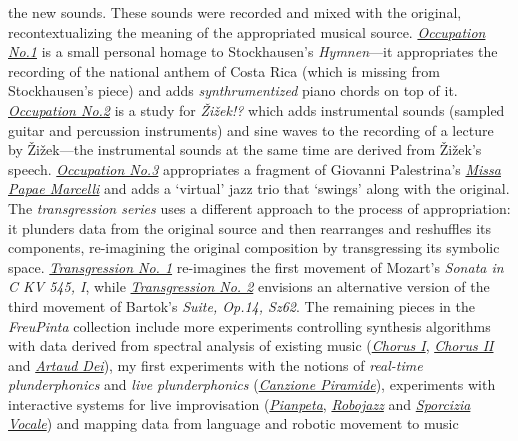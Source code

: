 the new sounds. These sounds were recorded and mixed with the original, recontextualizing the meaning of the appropriated musical source. \href{http://www.federicoreuben.com/media/audio/mp3/Sporcizia_Accademica/contents/05%20Occupation%20No.1.mp3}{\emph{Occupation No.1}} is a small personal homage to Stockhausen's \emph{Hymnen}---it appropriates the recording of the national anthem of Costa Rica (which is missing from Stockhausen's piece) and adds \emph{synthrumentized} piano chords on top of it. \href{http://www.federicoreuben.com/media/audio/mp3/Sporcizia_Accademica/contents/06%20Occupation%20No.2.mp3}{\emph{Occupation No.2}} is a study for \emph{\v{Z}i\v{z}ek!?} which adds instrumental sounds (sampled guitar and percussion instruments) and sine waves to the recording of a lecture by \v{Z}i\v{z}ek---the instrumental sounds at the same time are derived from \v{Z}i\v{z}ek's speech. \href{http://www.federicoreuben.com/media/audio/mp3/Sporcizia_Accademica/contents/07%20Occupation%20No.3.mp3}{\emph{Occupation No.3}} appropriates a fragment of Giovanni Palestrina's \href{http://en.wikipedia.org/wiki/Missa_Papae_Marcelli}{\emph{Missa Papae Marcelli}} and adds a `virtual' jazz trio that `swings' along with the original. The \emph{transgression series} uses a different approach to the process of appropriation: it plunders data from the original source and then rearranges and reshuffles its components, re-imagining the original composition by transgressing its symbolic space. \href{http://www.federicoreuben.com/media/audio/mp3/Sporcizia_Accademica/contents/08%20Transgression%20No.1.mp3}{\emph{Transgression No. 1}} re-imagines the first movement of Mozart's \emph{Sonata in C KV 545, I}, while \href{http://www.federicoreuben.com/media/audio/mp3/Sporcizia_Accademica/contents/09%20Transgression%20No.2.mp3}{\emph{Transgression No. 2}} envisions an alternative version of the third movement of Bartok's \emph{Suite, Op.14, Sz62}. The remaining pieces in the \emph{FreuPinta} collection include more experiments controlling synthesis algorithms with data derived from spectral analysis of existing music (\href{http://www.federicoreuben.com/media/audio/mp3/Sporcizia_Accademica/contents/12%20Chorus%20I.mp3}{\emph{Chorus I}}, \href{http://www.federicoreuben.com/media/audio/mp3/Sporcizia_Accademica/contents/14%20Chorus%20II.mp3}{\emph{Chorus II}} and \href{http://www.federicoreuben.com/media/audio/mp3/Sporcizia_Accademica/contents/18%20Artaud%20Dei.mp3}{\emph{Artaud Dei}}), my first experiments with the notions of \emph{real-time plunderphonics} and \emph{live plunderphonics} (\href{http://www.federicoreuben.com/media/audio/mp3/Sporcizia_Accademica/contents/10%20Canzione%20Piramide.mp3}{\emph{Canzione Piramide}}), experiments with interactive systems for live improvisation (\href{http://www.federicoreuben.com/media/audio/mp3/Sporcizia_Accademica/contents/11%20Pianpeta.mp3}{\emph{Pianpeta}}, \href{http://www.federicoreuben.com/media/audio/mp3/Sporcizia_Accademica/contents/16%20Robojazz.mp3}{\emph{Robojazz}} and \href{http://www.federicoreuben.com/media/audio/mp3/Sporcizia_Accademica/contents/17%20Sporcizia%20Vocale.mp3}{\emph{Sporcizia Vocale}}) and mapping data from language and robotic movement to music 